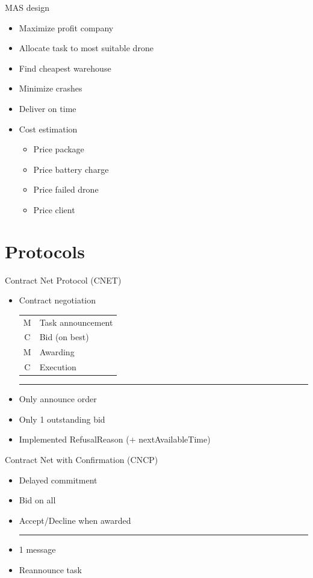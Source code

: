 \documentclass[notes]{beamer}
\newcommand{\seperation}{\vspace{0.5cm}\hrule\vspace{0.5cm}}
\begin{document}
	\begin{frame}{MAS design}
		\begin{itemize}
			\item Maximize profit company
			\item Allocate task to most suitable drone
			\item Find cheapest warehouse
			\item Minimize crashes
			\item Deliver on time
			\item Cost estimation
				\begin{itemize}
				\item Price package
				\item Price battery charge
				\item Price failed drone
				\item Price client
				\end{itemize}
		\end{itemize}
	\end{frame}

	\section{Protocols}
	\begin{frame}{Contract Net Protocol (CNET)}
		\begin{itemize}
			\item Contract negotiation
			\linebreak
			\begin{tabular}{cl}
				M & Task announcement \\
				C & Bid (on best) \\
				M & Awarding \\
				C & Execution \\
			\end{tabular}
			\seperation
			\item Only announce order
			\item Only 1 outstanding bid
			\item Implemented RefusalReason (+ nextAvailableTime)
		\end{itemize}
	\end{frame}

	\begin{frame}{Contract Net with Confirmation (CNCP)}
		\begin{itemize}
			\item Delayed commitment
			\item Bid on all
			\item Accept/Decline when awarded
			\seperation
			\item 1 message
			\item Reannounce task
		\end{itemize}
	\end{frame}
\end{document}
